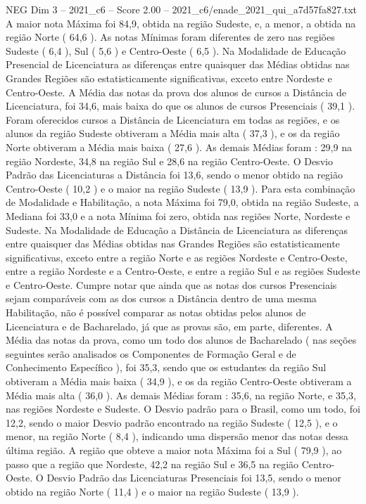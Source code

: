 \begin{textsample}{NEG Dim 3 – 2021\_c6 – Score 2.00 – 2021\_c6/enade\_2021\_qui\_a7d57fa827.txt}
A maior nota Máxima foi 84,9, obtida na região Sudeste, e, a menor, a obtida na região Norte ( 64,6 ).
As notas Mínimas foram diferentes de zero nas regiões Sudeste ( 6,4 ), Sul ( 5,6 ) e Centro-Oeste ( 6,5 ).
Na Modalidade de Educação Presencial de Licenciatura as diferenças entre quaisquer das Médias obtidas nas Grandes Regiões são estatisticamente significativas, exceto entre Nordeste e Centro-Oeste.
A Média das notas da prova dos alunos de cursos a Distância de Licenciatura, foi 34,6, mais baixa do que os alunos de cursos Presenciais ( 39,1 ).
Foram oferecidos cursos a Distância de Licenciatura em todas as regiões, e os alunos da região Sudeste obtiveram a Média mais alta ( 37,3 ), e os da região Norte obtiveram a Média mais baixa ( 27,6 ).
As demais Médias foram : 29,9 na região Nordeste, 34,8 na região Sul e 28,6 na região Centro-Oeste.
O Desvio Padrão das Licenciaturas a Distância foi 13,6, sendo o menor obtido na região Centro-Oeste ( 10,2 ) e o maior na região Sudeste ( 13,9 ).
Para esta combinação de Modalidade e Habilitação, a nota Máxima foi 79,0, obtida na região Sudeste, a Mediana foi 33,0 e a nota Mínima foi zero, obtida nas regiões Norte, Nordeste e Sudeste.
Na Modalidade de Educação a Distância de Licenciatura as diferenças entre quaisquer das Médias obtidas nas Grandes Regiões são estatisticamente significativas, exceto entre a região Norte e as regiões Nordeste e Centro-Oeste, entre a região Nordeste e a Centro-Oeste, e entre a região Sul e as regiões Sudeste e Centro-Oeste.
Cumpre notar que ainda que as notas dos cursos Presenciais sejam comparáveis com as dos cursos a Distância dentro de uma mesma Habilitação, não é possível comparar as notas obtidas pelos alunos de Licenciatura e de Bacharelado, já que as provas são, em parte, diferentes.
A Média das notas da prova, como um todo dos alunos de Bacharelado ( nas seções seguintes serão analisados os Componentes de Formação Geral e de Conhecimento Específico ), foi 35,3, sendo que os estudantes da região Sul obtiveram a Média mais baixa ( 34,9 ), e os da região Centro-Oeste obtiveram a Média mais alta ( 36,0 ).
As demais Médias foram : 35,6, na região Norte, e 35,3, nas regiões Nordeste e Sudeste.
O Desvio padrão para o Brasil, como um todo, foi 12,2, sendo o maior Desvio padrão encontrado na região Sudeste ( 12,5 ), e o menor, na região Norte ( 8,4 ), indicando uma dispersão menor das notas dessa última região.
A região que obteve a maior nota Máxima foi a Sul ( 79,9 ), ao passo que a região que Nordeste, 42,2 na região Sul e 36,5 na região Centro-Oeste.
O Desvio Padrão das Licenciaturas Presenciais foi 13,5, sendo o menor obtido na região Norte ( 11,4 ) e o maior na região Sudeste ( 13,9 ).

\end{textsample}
